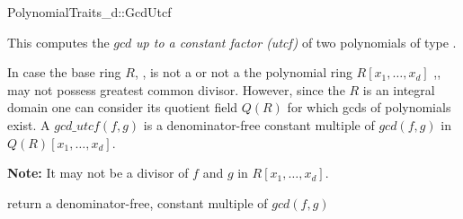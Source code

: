 \begin{ccRefConcept}{PolynomialTraits_d::GcdUtcf}

\ccDefinition

This  computes the $gcd$  {\em up to a constant factor (utcf)} 
of two polynomials of type . 

In case the base ring $R$, , 
is not a  or not a  the polynomial ring $R[x_1,\dots,x_d]$ 
,, may not 
possess greatest common divisor. However, since the $R$ is an integral domain one can 
consider its quotient field $Q(R)$ for which gcds of polynomials exist. 
A $gcd\_utcf(f,g)$ is a denominator-free constant multiple of 
$gcd(f,g)$ in $Q(R)[x_1,\dots,x_d]$. 

{\bf Note:} It may not be a divisor of $f$ and $g$ in $R[x_1,\dots,x_d]$.

\ccRefines 


\ccTypes


\ccGlue
{}\ccGlue
{}

\ccOperations

                {return a denominator-free, constant multiple of $gcd(f,g)$}




\ccSeeAlso

\\
\\
\\

\end{ccRefConcept}